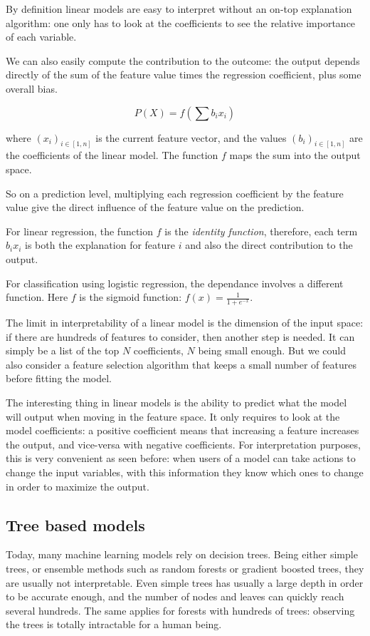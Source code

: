 \documentclass[a4paper,11pt]{kth-mag}
\begin{document}
By definition linear models are easy to interpret without an on-top explanation algorithm: one only has to look at the coefficients to see the relative importance of each variable.

We can also easily compute the contribution to the outcome: the output depends directly of the sum of the feature value times the regression 	coefficient, plus some overall bias.

\[
	P(X) = f \left( \sum b_i x_i \right)
\]

where $(x_i)_{i \in [1, n]}$ is the current feature vector, and the values $(b_i)_{i \in [1, n]}$ are the coefficients of the linear model. The function $f$ maps the sum into the output space.

So on a prediction level, multiplying each regression coefficient by the feature value give the direct influence of the feature value on the prediction.

For linear regression, the function $f$ is the \textit{identity function}, therefore, each term $b_i x_i$ is both the explanation for feature $i$ and also the direct contribution to the output.

For classification using logistic regression, the dependance involves a different function. Here $f$ is the sigmoid function: $f(x) = \frac1{1 + e^{-x}}$.

The limit in interpretability of a linear model is the dimension of the input space: if there are hundreds of features to consider, then another step is needed. It can simply be a list of the top $N$ coefficients, $N$ being small enough. But we could also consider a feature selection algorithm that keeps a small number of features before fitting the model.

The interesting thing in linear models is the ability to predict what the model will output when moving in the feature space. It only requires to look at the model coefficients: a positive coefficient means that increasing a feature increases the output, and vice-versa with negative coefficients. For interpretation purposes, this is very convenient as seen before: when users of a model can take actions to change the input variables, with this information they know which ones to change in order to maximize the output.

\subsection{Tree based models}

Today, many machine learning models rely on decision trees. Being either simple trees, or ensemble methods such as random forests or gradient boosted trees, they are usually not interpretable. Even simple trees has usually a large depth in order to be accurate enough, and the number of nodes and leaves can quickly reach several hundreds. The same applies for forests with hundreds of trees: observing the trees is totally intractable for a human being.
\end{document}
